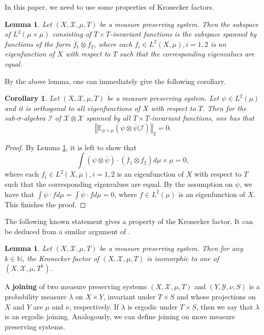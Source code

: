 \documentclass[reqno,12pt]{amsart}
\newtheorem{lemma}[thm]{Lemma}
\newtheorem{cor}[thm]{Corollary}
\newcommand{\norm}[1]{\left\Vert #1\right\Vert}
\def \N {\mathbb N}
\def \X {\mathcal{X}}
\def \Y {\mathcal{Y}}
\numberwithin{equation}{section}
\begin{document}
In this paper, we need to use some properties of Kronecker factors.
\begin{lemma}\cite[Theorem 4.16]{HK}\label{eigenfunctions and invariant}
Let $(X,\X,\mu,T)$ be a measure preserving system. Then the subspace of $L^2(\mu\times \mu)$ consisting of $T\times T$-invariant functions is the subspace spanned by functions of the form $\overline{f}_1\otimes f_2$, where each $f_i\in L^2(X,\mu),i=1,2$ is an eigenfunction of $X$ with respect to $T$ such that the corresponding eigenvalues are equal.
\end{lemma}
By the above lemma, one can immediately give the following corollary.
\begin{cor}\label{orthogonal with eigenfunctions} Let $(X,\X,\mu,T)$ be a measure preserving system. Let $\psi\in L^2(\mu)$ and it is orthogonal to all eigenfunctions of $X$ with respect to $T$. Then for the sub-$\sigma$-algebra $\mathcal{I}$ of $\X\otimes \X$ spanned by all $T\times T$-invariant functions, one has that $$\norm{\mathbb{E}_{\mu\times \mu}(\psi\otimes \overline{\psi}|\mathcal{I})}_{2}=0.$$
\end{cor}
\begin{proof}
By Lemma \ref{eigenfunctions and invariant}, it is left to show that $$\int (\psi\otimes \overline{\psi} )\cdot (\overline{f}_1\otimes f_2)d\mu\times \mu=0, $$ where each $f_i\in L^2(X,\mu),i=1,2$ is an eigenfunction of $X$ with respect to $T$ such that the corresponding eigenvalues are equal.
By the assumption on $\psi$, we have that $\int \psi\cdot fd\mu=\int \overline{\psi}\cdot fd\mu=0$, where $f\in L^2(\mu)$ is an eigenfunction of $X$. This finishes the proof.
\end{proof}

The following known statement gives a property of the Kronecker factor. It can be deduced from a similar argument of \cite[Second paragraph of the statements after Definition 3.3]{F77}.
\begin{lemma}\label{lem6}
	Let $(X,\X,\mu,T)$ be a measure preserving system. Then for any $k\in\N$, the Kronecker factor of $(X,\X,\mu,T)$ is isomorphic to one of $(X,\X,\mu,T^k)$.
\end{lemma}

A \textbf{joining} of two measure preserving systems $(X,\X,\mu,T)$ and $(Y,\Y,\nu,S)$ is a probability measure $\lambda$ on $X\times Y$, invariant under $T\times S$ and whose projections on $X$ and $Y$ are $\mu$ and $\nu$, respectively. If $\lambda$ is ergodic under $T\times S$, then we say that $\lambda$ is an ergodic joining. Analogously, we can define joining on more measure preserving systems.
\end{document}
